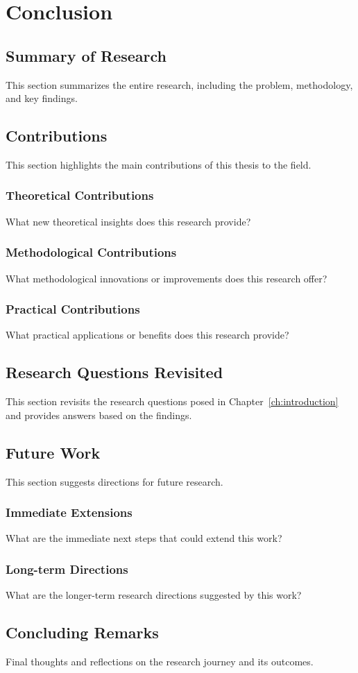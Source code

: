 \chapter{Conclusion}
\label{ch:conclusion}

\section{Summary of Research}
This section summarizes the entire research, including the problem, methodology, and key findings.

\section{Contributions}
This section highlights the main contributions of this thesis to the field.

\subsection{Theoretical Contributions}
What new theoretical insights does this research provide?

\subsection{Methodological Contributions}
What methodological innovations or improvements does this research offer?

\subsection{Practical Contributions}
What practical applications or benefits does this research provide?

\section{Research Questions Revisited}
This section revisits the research questions posed in Chapter~\ref{ch:introduction} and provides answers based on the findings.

\section{Future Work}
This section suggests directions for future research.

\subsection{Immediate Extensions}
What are the immediate next steps that could extend this work?

\subsection{Long-term Directions}
What are the longer-term research directions suggested by this work?

\section{Concluding Remarks}
Final thoughts and reflections on the research journey and its outcomes.
